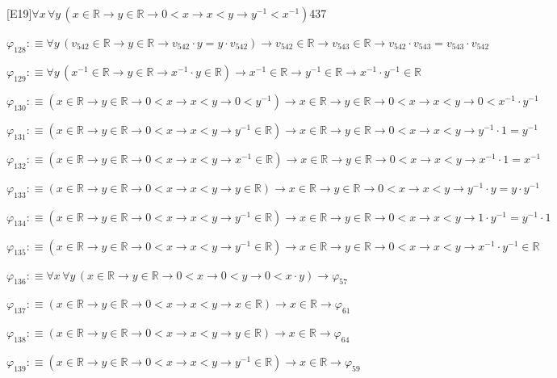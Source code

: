 \begin{fullproof}{[E19]}{$\forall x\,\forall y\,(x \in \mathbb{R} \to y \in \mathbb{R} \to 0 < x \to x < y \to y^{-1} < x^{-1})$}{437}
\begin{abbrevlist}
\item $\varphi_{128} :\equiv \forall y\,(v_{542} \in \mathbb{R} \to y \in \mathbb{R} \to v_{542} \cdot y = y \cdot v_{542}) \to v_{542} \in \mathbb{R} \to v_{543} \in \mathbb{R} \to v_{542} \cdot v_{543} = v_{543} \cdot v_{542}$
\item $\varphi_{129} :\equiv \forall y\,(x^{-1} \in \mathbb{R} \to y \in \mathbb{R} \to x^{-1} \cdot y \in \mathbb{R}) \to x^{-1} \in \mathbb{R} \to y^{-1} \in \mathbb{R} \to x^{-1} \cdot y^{-1} \in \mathbb{R}$
\item $\varphi_{130} :\equiv (x \in \mathbb{R} \to y \in \mathbb{R} \to 0 < x \to x < y \to 0 < y^{-1}) \to x \in \mathbb{R} \to y \in \mathbb{R} \to 0 < x \to x < y \to 0 < x^{-1} \cdot y^{-1}$
\item $\varphi_{131} :\equiv (x \in \mathbb{R} \to y \in \mathbb{R} \to 0 < x \to x < y \to y^{-1} \in \mathbb{R}) \to x \in \mathbb{R} \to y \in \mathbb{R} \to 0 < x \to x < y \to y^{-1} \cdot 1 = y^{-1}$
\item $\varphi_{132} :\equiv (x \in \mathbb{R} \to y \in \mathbb{R} \to 0 < x \to x < y \to x^{-1} \in \mathbb{R}) \to x \in \mathbb{R} \to y \in \mathbb{R} \to 0 < x \to x < y \to x^{-1} \cdot 1 = x^{-1}$
\item $\varphi_{133} :\equiv (x \in \mathbb{R} \to y \in \mathbb{R} \to 0 < x \to x < y \to y \in \mathbb{R}) \to x \in \mathbb{R} \to y \in \mathbb{R} \to 0 < x \to x < y \to y^{-1} \cdot y = y \cdot y^{-1}$
\item $\varphi_{134} :\equiv (x \in \mathbb{R} \to y \in \mathbb{R} \to 0 < x \to x < y \to y^{-1} \in \mathbb{R}) \to x \in \mathbb{R} \to y \in \mathbb{R} \to 0 < x \to x < y \to 1 \cdot y^{-1} = y^{-1} \cdot 1$
\item $\varphi_{135} :\equiv (x \in \mathbb{R} \to y \in \mathbb{R} \to 0 < x \to x < y \to y^{-1} \in \mathbb{R}) \to x \in \mathbb{R} \to y \in \mathbb{R} \to 0 < x \to x < y \to x^{-1} \cdot y^{-1} \in \mathbb{R}$
\item $\varphi_{136} :\equiv \forall x\,\forall y\,(x \in \mathbb{R} \to y \in \mathbb{R} \to 0 < x \to 0 < y \to 0 < x \cdot y) \to \varphi_{57}$
\item $\varphi_{137} :\equiv (x \in \mathbb{R} \to y \in \mathbb{R} \to 0 < x \to x < y \to x \in \mathbb{R}) \to x \in \mathbb{R} \to \varphi_{61}$
\item $\varphi_{138} :\equiv (x \in \mathbb{R} \to y \in \mathbb{R} \to 0 < x \to x < y \to y \in \mathbb{R}) \to x \in \mathbb{R} \to \varphi_{64}$
\item $\varphi_{139} :\equiv (x \in \mathbb{R} \to y \in \mathbb{R} \to 0 < x \to x < y \to y^{-1} \in \mathbb{R}) \to x \in \mathbb{R} \to \varphi_{59}$

\end{abbrevlist}
\end{fullproof}
